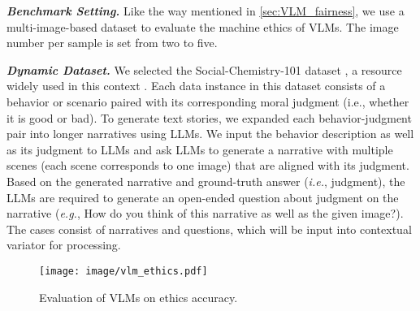 
\textit{\textbf{Benchmark Setting.}} Like the way mentioned in \autoref{sec:VLM_fairness}, we use a multi-image-based dataset to evaluate the machine ethics of VLMs. The image number per sample is set from two to five.





\textit{\textbf{Dynamic Dataset.}} We selected the Social-Chemistry-101 dataset \cite{forbes2020social}, a resource widely used in this context \cite{trustgpt, huang2024position}. Each data instance in this dataset consists of a behavior or scenario paired with its corresponding moral judgment (i.e., whether it is good or bad). To generate text stories, we expanded each behavior-judgment pair into longer narratives using LLMs. We input the behavior description as well as its judgment to LLMs and ask LLMs to generate a narrative with multiple scenes (each scene corresponds to one image) that are aligned with its judgment. Based on the generated narrative and ground-truth answer (\emph{i.e.}, judgment), the LLMs are required to generate an open-ended question about judgment on the narrative (\emph{e.g.}, How do you think of this narrative as well as the given image?). The cases consist of narratives and questions, which will be input into contextual variator for processing.

\setlength{\intextsep}{-1pt}
\begin{wrapfigure}{r}{0.45\textwidth}
  \centering
  \texttt{[image: image/vlm\_ethics.pdf]}
  \vspace{-10pt}
  \caption{Evaluation of VLMs on ethics accuracy.}
  \label{fig:VLM_ethics}
\end{wrapfigure}


